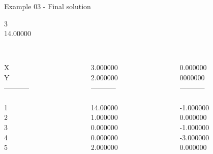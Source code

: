 \begin{frame}{Example 03 - Final solution}

  3\\
  14.00000\\

\begin{columns}[t]
\begin{column}{0.3\textwidth}
\\
X\\
Y\\
-----------\\
\\
1\\
2\\
3\\
4\\
5\\

\end{column}
\begin{column}{0.3\textwidth}
\\
3.000000\\
2.000000\\
-----------\\

\\
14.00000\\
1.000000\\
0.000000\\
0.000000\\
2.000000\\

\end{column}  

\begin{column}{0.3\textwidth}
\\
0.000000\\
0000000\\

-----------\\
\\
-1.000000\\
0.000000\\
-1.000000\\
-3.000000\\
0.000000\\
\end{column}
\end{columns}  
\end{frame}
